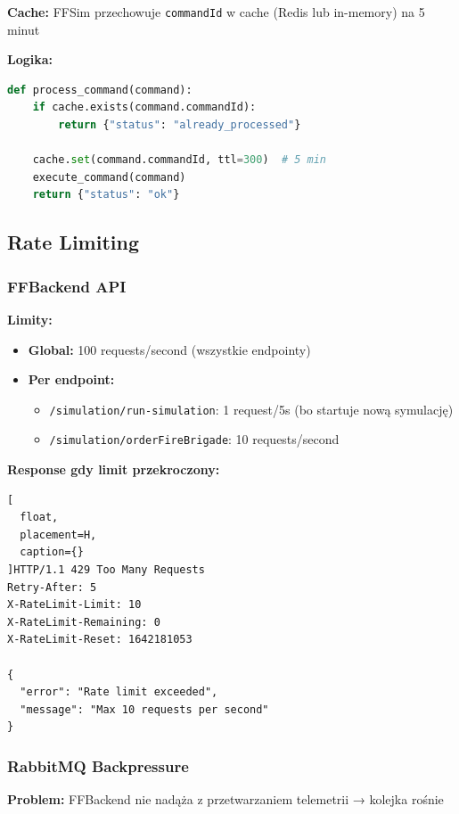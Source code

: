 \documentclass[11pt,a4paper] {article}
\begin{document}
\textbf{Cache:} FFSim przechowuje \texttt{commandId} w cache (Redis lub in-memory) na 5 minut

\textbf{Logika:}
\begin{lstlisting}[language=Python]
def process_command(command):
    if cache.exists(command.commandId):
        return {"status": "already_processed"}
    
    cache.set(command.commandId, ttl=300)  # 5 min
    execute_command(command)
    return {"status": "ok"}
\end{lstlisting}

\subsection{Rate Limiting}

\subsubsection{FFBackend API}

\textbf{Limity:}
\begin{itemize}
    \item \textbf{Global:} 100 requests/second (wszystkie endpointy)
    \item \textbf{Per endpoint:} 
    \begin{itemize}
        \item \texttt{/simulation/run-simulation}: 1 request/5s (bo startuje nową symulację)
        \item \texttt{/simulation/orderFireBrigade}: 10 requests/second
    \end{itemize}
\end{itemize}

\textbf{Response gdy limit przekroczony:}
\begin{lstlisting}[
  float,
  placement=H,
  caption={}
]HTTP/1.1 429 Too Many Requests
Retry-After: 5
X-RateLimit-Limit: 10
X-RateLimit-Remaining: 0
X-RateLimit-Reset: 1642181053

{
  "error": "Rate limit exceeded",
  "message": "Max 10 requests per second"
}
\end{lstlisting}

\subsubsection{RabbitMQ Backpressure}

\textbf{Problem:} FFBackend nie nadąża z przetwarzaniem telemetrii → kolejka rośnie
\end{document}

